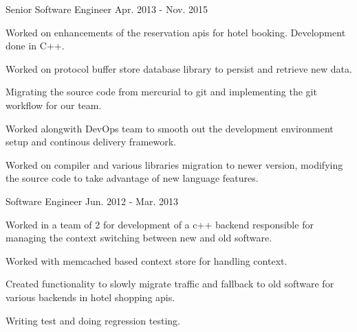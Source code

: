 \begin{cventries}
  \cventry
    {Senior Software Engineer} %
    {} %
    {} %
    {Apr. 2013 - Nov. 2015} %
    {
      \begin{cvitems} %
        \item {Worked on enhancements of the reservation apis for hotel booking. Development done in C++.}
        \item {Worked on protocol buffer store database library to persist and retrieve new data.}
        \item {Migrating the source code from mercurial to git and implementing the git workflow for our team. }
        \item {Worked alongwith DevOps team to smooth out the development environment setup and continous delivery framework.}
        \item {Worked on compiler and various libraries migration to newer version, modifying the source code to take advantage of new language features.}
      \end{cvitems}
    }
    {}

  \cventry
    {Software Engineer} %
    {} %
    {} %
    {Jun. 2012 - Mar. 2013} %
    {
      \begin{cvitems} %
        \item {Worked in a team of 2 for development of a c++ backend responsible for managing the context switching between new and old software.}
        \item {Worked with memcached based context store for handling context.}
        \item {Created functionality to slowly migrate traffic and fallback to old software for various backends in hotel shopping apis.}
        \item {Writing test and doing regression testing.}
      \end{cvitems}
    }
    {}


\end{cventries}
